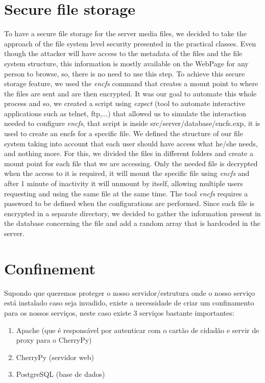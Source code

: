 \documentclass[11pt,a4paper]{report}
\begin{document}
\chapter{Secure file storage}
To have a secure file storage for the server media files, we decided to take the approach of the file system level security presented in the practical classes. Even though the attacker will have access to the metadata of the files and the file system structure, this information is mostly available on the WebPage for any person to browse, so, there is no need to use this step.
\newline
To achieve this secure storage feature, we used the \emph{encfs} command that creates a mount point to where the files are sent and are then encrypted.
\newline
It was our goal to automate this whole process and so, we created a script using \emph{expect} (tool to automate interactive applications such as telnet, ftp,...) that allowed us to simulate the interaction needed to configure \emph{encfs}, that script is inside src/server/database/encfs.exp, it is used to create an encfs for a specific file.
\newline
We defined the structure of our file system taking into account that each user should have access what he/she needs, and nothing more.
\newline
For this, we divided the files in different folders and create a mount point for each file that we are accessing. Only the needed file is decrypted when the access to it is required, it will mount the specific file using \emph{encfs} and after 1 minute of inactivity it will unmount by itself, allowing multiple users requesting and using the same file at the same time.
\newline
The tool \emph{encfs} requires a password to be defined when the configurations are performed. Since each file is encrypted in a separate directory, we decided to gather the information present in the database concerning the file and add a random array that is hardcoded in the server.

\chapter{Confinement}
\label{sec:docker}
Supondo que queremos proteger o nosso servidor/estrutura onde o nosso serviço está instalado caso seja invadido, existe a necessidade de criar um confinamento para os nossos serviços, neste caso existe 3 serviços bastante importantes:
\begin{enumerate}
\item Apache (que é responsável por autenticar com o cartão de cidadão e servir de proxy para o CherryPy)
\item CherryPy (servidor web)
\item PostgreSQL (base de dados)
\end{enumerate}
\end{document}
